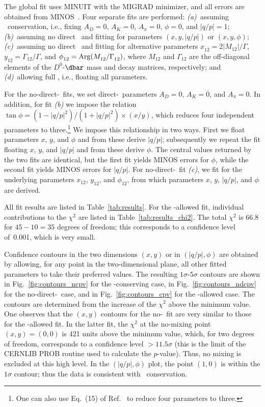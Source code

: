 The global fit uses MINUIT with the MIGRAD minimizer, 
and all errors are obtained from MINOS~\cite{MINUIT:webpage}. 
Four separate fits are performed: 
{\it (a)}\ assuming \cp\ conservation, i.e., fixing
$A^{}_D\!=\!0$, $A_K\!=\!0$, $A^{}_\pi\!=\!0$, $\phi\!=\!0$, 
and $|q/p|\!=\!1$;
{\it (b)}\ assuming no direct \cpv\ and fitting for
parameters $(x,y,|q/p|)$ or $(x,y,\phi)$; 
{\it (c)}\ assuming no direct \cpv\ and fitting for
alternative parameters $x^{}_{12}= 2|M^{}_{12}|/\Gamma$, 
$y^{}_{12}= \Gamma^{}_{12}/\Gamma$, and 
$\phi^{}_{12}= {\rm Arg}(M^{}_{12}/\Gamma^{}_{12})$,
where $M^{}_{12}$ and $\Gamma^{}_{12}$ are the off-diagonal
elements of the $D^0$-$\dbar$ mass and decay matrices, respectively; and
{\it (d)}\ allowing full \cpv, i.e., floating all parameters. 

For the no-direct-\cpv\ fits, we set direct-\cpv\ parameters 
$A^{}_D\!=\!0$, $A_K\!=\!0$, and $A^{}_\pi\!=\!0$. In addition, 
for fit {\it (b)\/} we impose the relation~\cite{Ciuchini:2007cw,Kagan:2009gb}
$\tan\phi = (1-|q/p|^2)/(1+|q/p|^2)\times (x/y)$, which reduces 
four independent parameters to 
three.\footnote{One can also use Eq.~(15) of Ref.~\cite{Grossman:2009mn}
to reduce four parameters to three.} 
We impose this relationship in two ways. First we float parameters
$x$, $y$, and $\phi$ and from these derive $|q/p|$; subsequently we
repeat the fit floating $x$, $y$, and $|q/p|$ and from these derive 
$\phi$. The central values returned by the two fits are identical,
but the first fit yields MINOS errors for $\phi$, while the second
fit yields MINOS errors for $|q/p|$. For no-direct-\cpv\ fit 
{\it (c)}, we fit for the underlying parameters $x^{}_{12}$, $y^{}_{12}$, 
and $\phi^{}_{12}$, from which parameters $x$, $y$, $|q/p|$, and $\phi$ 
are derived. 

All fit results are listed in 
Table~\ref{tab:results}. For the \cpv-allowed fit,
individual contributions to the $\chi^2$ are listed 
in Table~\ref{tab:results_chi2}. The total $\chi^2$ 
is 66.8 for $45-10=35$ degrees of freedom; this 
corresponds to a confidence level of~0.001,
which is very small.

Confidence contours in the two dimensions $(x,y)$ or 
in $(|q/p|,\phi)$ are obtained by allowing, for any point in the
two-dimensional plane, all other fitted parameters to take their 
preferred values. The resulting $1\sigma$-$5\sigma$ contours 
are shown 
in Fig.~\ref{fig:contours_ncpv} for the \cp-conserving case, 
in Fig.~\ref{fig:contours_ndcpv} for the no-direct-\cpv\ case, 
and in Fig.~\ref{fig:contours_cpv} for the \cpv-allowed 
case. The contours are determined from the increase of the
$\chi^2$ above the minimum value.
One observes that the $(x,y)$ contours for the no-\cpv\ fit 
are very similar to those for the \cpv-allowed fit. In the latter
fit, the $\chi^2$ at the no-mixing point $(x,y)\!=\!(0,0)$ is 421
units above the minimum value, which, for two degrees of freedom,
corresponds to a confidence level $>11.5\sigma$ (this is the limit
of the CERNLIB PROB routine used to calculate the $p$-value). Thus,
no mixing is excluded at this high level. In the $(|q/p|,\phi)$ plot,
the point $(1,0)$ is within the $1\sigma$ contour; thus the data is
consistent with \cp\ conservation.

